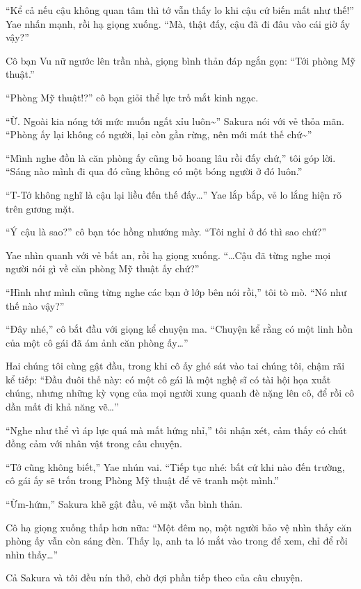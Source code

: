\documentclass[../main.tex]{subfiles}
\begin{document}
``Kể cả nếu cậu không quan tâm thì tớ vẫn thấy lo khi cậu cứ biến mất như thế!'' Yae nhấn mạnh, rồi hạ giọng xuống. ``Mà, thật đấy, cậu đã đi đâu vào cái giờ ấy vậy?''

Cô bạn Vu nữ ngước lên trần nhà, giọng bình thản đáp ngắn gọn: ``Tới phòng Mỹ thuật.''

``Phòng Mỹ thuật!?'' cô bạn giỏi thể lực trố mắt kinh ngạc.

``Ừ. Ngoài kia nóng tới mức muốn ngất xỉu luôn\~{}'' Sakura nói với vẻ thỏa mãn. ``Phòng ấy lại không có người, lại còn gần rừng, nên mới mát thế chứ\~{}''

``Mình nghe đồn là căn phòng ấy cũng bỏ hoang lâu rồi đấy chứ,'' tôi góp lời. ``Sáng nào mình đi qua đó cũng không có một bóng người ở đó luôn.''

``T-Tớ không nghĩ là cậu lại liều đến thế đấy\dots'' Yae lắp bắp, vẻ lo lắng hiện rõ trên gương mặt.

``Ý cậu là sao?'' cô bạn tóc hồng nhướng mày. ``Tôi nghỉ ở đó thì sao chứ?''

Yae nhìn quanh với vẻ bất an, rồi hạ giọng xuống. ``\dots Cậu đã từng nghe mọi người nói gì về căn phòng Mỹ thuật ấy chứ?''

``Hình như mình cũng từng nghe các bạn ở lớp bên nói rồi,'' tôi tò mò. ``Nó như thế nào vậy?''

``Đây nhé,'' cô bắt đầu với giọng kể chuyện ma. ``Chuyện kể rằng có một linh hồn của một cô gái đã ám ảnh căn phòng ấy\dots''

Hai chúng tôi cùng gật đầu, trong khi cô ấy ghé sát vào tai chúng tôi, chậm rãi kể tiếp: ``Đầu đuôi thế này: có một cô gái là một nghệ sĩ có tài hội họa xuất chúng, nhưng những kỳ vọng của mọi người xung quanh đè nặng lên cô, để rồi cô dần mất đi khả năng vẽ\dots''

``Nghe như thể vì áp lực quá mà mất hứng nhỉ,'' tôi nhận xét, cảm thấy có chút đồng cảm với nhân vật trong câu chuyện.

``Tớ cũng không biết,'' Yae nhún vai. ``Tiếp tục nhé: bất cứ khi nào đến trường, cô gái ấy sẽ trốn trong Phòng Mỹ thuật để vẽ tranh một mình.''

``Ừm-hứm,'' Sakura khẽ gật đầu, vẻ mặt vẫn bình thản.


Cô hạ giọng xuống thấp hơn nữa: ``Một đêm nọ, một người bảo vệ nhìn thấy căn phòng ấy vẫn còn sáng đèn. Thấy lạ, anh ta ló mắt vào trong để xem, chỉ để rồi nhìn thấy\dots''

Cả Sakura và tôi đều nín thở, chờ đợi phần tiếp theo của câu chuyện.
\end{document}
